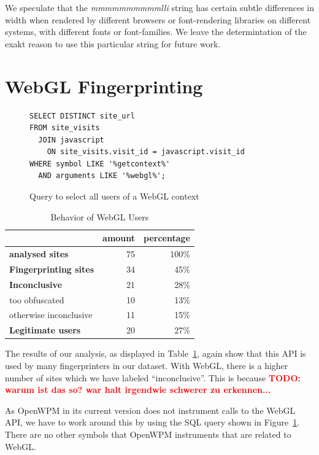 \documentclass[
    fontsize=12pt,
    headings=small,
    parskip=half,
    bibliography=totoc,
    numbers=noenddot,
    open=any
    ]{scrreprt}
\newcommand{\todo}[1]{\textcolor{red}{\textbf{TODO: #1}}}
\begin{document}
We speculate that the \textit{mmmmmmmmmmlli} string has certain subtle differences in width
when rendered by different browsers or font-rendering libraries on different systems, with
different fonts or font-families. We leave the determintation of the exakt reason to use
this particular string for future work.


\section{WebGL Fingerprinting}

\begin{figure}
\begin{verbatim}
SELECT DISTINCT site_url
FROM site_visits
  JOIN javascript
    ON site_visits.visit_id = javascript.visit_id
WHERE symbol LIKE '%getcontext%'
  AND arguments LIKE '%webgl%';
\end{verbatim}
\caption{Query to select all users of a WebGL context}
\label{code:webgl_query}
\end{figure}

\begin{table}
\centering
\caption{Behavior of WebGL Users}
\begin{tabular}{l r r}
    \toprule
    & amount & percentage \\
    \midrule
    \textbf{analysed sites} & 75 & 100\% \\
    \midrule
    \textbf{Fingerprinting sites} & 34 & 45\% \\
    \midrule
    \textbf{Inconclusive} & 21 & 28\% \\
    too obfuscated & 10 & 13\% \\
    otherwise inconclusive & 11 & 15\% \\
    \midrule
    \textbf{Legitimate users} & 20 & 27\% \\
    \bottomrule
\end{tabular}
\label{table:webgl_users}
\end{table}

The results of our analysis, as displayed in Table~\ref{table:webgl_users}, again show that this
API is used by many fingerprinters in our dataset.
With WebGL, there is a higher number of sites which we have labeled ``inconclusive''.
This is because \todo{warum ist das so? war halt irgendwie schwerer zu erkennen...}

As OpenWPM in its current version does not instrument calls to the WebGL API, we have to
work around this by using the SQL query shown in Figure~\ref{code:webgl_query}.
There are no other symbols that OpenWPM instruments that are related to WebGL.
\end{document}
